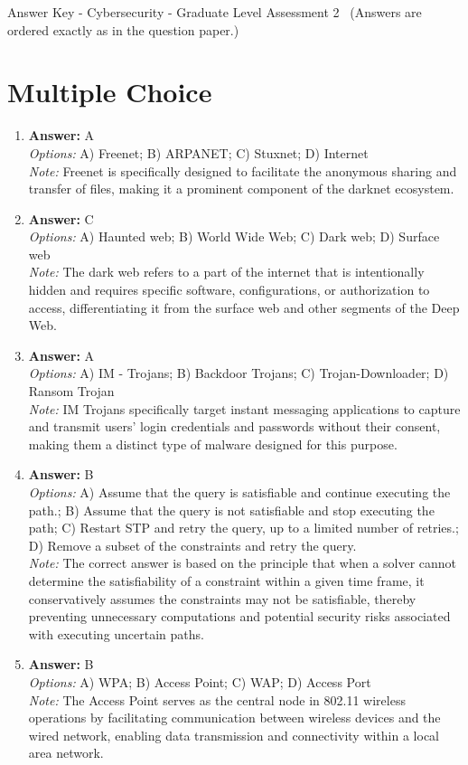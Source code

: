 \documentclass[12pt]{article}
\begin{document}
\begin{center}
Answer Key - Cybersecurity - Graduate Level Assessment 2 \
\small (Answers are ordered exactly as in the question paper.)
\end{center}

\section*{Multiple Choice}
\begin{enumerate}[label=\arabic*.]
\item \textbf{Answer:} A
\\ \textit{Options:} A) Freenet; B) ARPANET; C) Stuxnet; D) Internet
\\ \textit{Note:} Freenet is specifically designed to facilitate the anonymous sharing and transfer of files, making it a prominent component of the darknet ecosystem.
\item \textbf{Answer:} C
\\ \textit{Options:} A) Haunted web; B) World Wide Web; C) Dark web; D) Surface web
\\ \textit{Note:} The dark web refers to a part of the internet that is intentionally hidden and requires specific software, configurations, or authorization to access, differentiating it from the surface web and other segments of the Deep Web.
\item \textbf{Answer:} A
\\ \textit{Options:} A) IM - Trojans; B) Backdoor Trojans; C) Trojan-Downloader; D) Ransom Trojan
\\ \textit{Note:} IM Trojans specifically target instant messaging applications to capture and transmit users' login credentials and passwords without their consent, making them a distinct type of malware designed for this purpose.
\item \textbf{Answer:} B
\\ \textit{Options:} A) Assume that the query is satisfiable and continue executing the path.; B) Assume that the query is not satisfiable and stop executing the path; C) Restart STP and retry the query, up to a limited number of retries.; D) Remove a subset of the constraints and retry the query.
\\ \textit{Note:} The correct answer is based on the principle that when a solver cannot determine the satisfiability of a constraint within a given time frame, it conservatively assumes the constraints may not be satisfiable, thereby preventing unnecessary computations and potential security risks associated with executing uncertain paths.
\item \textbf{Answer:} B
\\ \textit{Options:} A) WPA; B) Access Point; C) WAP; D) Access Port
\\ \textit{Note:} The Access Point serves as the central node in 802.11 wireless operations by facilitating communication between wireless devices and the wired network, enabling data transmission and connectivity within a local area network.
\end{enumerate}
\end{document}
